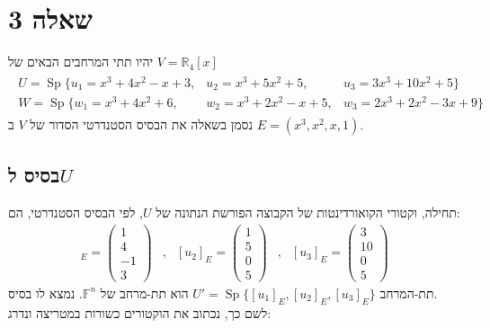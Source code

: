 \documentclass{article}
\DeclareMathOperator\Sp{Sp}
\def\reals{\mathbb{R}}
\begin{document}
\pagebreak

\section*{שאלה 3}

יהיו תתי המרחבים הבאים של $V=\reals_4[x]$
\begin{align*}
    \begin{matrix}
        U=\Sp\{ u_1=x^3+4x^2-x+3, & u_2=x^3+5x^2+5,   & u_3=3x^3+10x^2+5    \} \\
        W=\Sp\{ w_1=x^3+4x^2+6,   & w_2=x^3+2x^2-x+5, & w_3=2x^3+2x^2-3x+9  \}
    \end{matrix}
\end{align*}
נסמן בשאלה את הבסיס הסטנדרטי הסדור של $V$ ב $E=(x^3, x^2, x, 1)$.

\subsection*{בסיס ל$U$}
תחילה, וקטורי הקואורדינטות של הקבוצה הפורשת הנתונה של $U$, לפי הבסיס הסטנדרטי, הם:
\begin{align*}
    [u_1]_E=\begin{pmatrix}
        1  \\
        4  \\
        -1 \\
        3
    \end{pmatrix} & , &
    [u_2]_E=\begin{pmatrix}
        1 \\
        5 \\
        0 \\
        5
    \end{pmatrix} & , &
    [u_3]_E=\begin{pmatrix}
        3  \\
        10 \\
        0  \\
        5
    \end{pmatrix}
\end{align*}
תת-המרחב $U'=\Sp\{ [u_1]_E, [u_2]_E, [u_3]_E \}$ הוא תת-מרחב של $\mathbb{F}^n$. נמצא לו בסיס. \\
לשם כך, נכתוב את הוקטורים כשורות במטריצה ונדרג:
\end{document}
